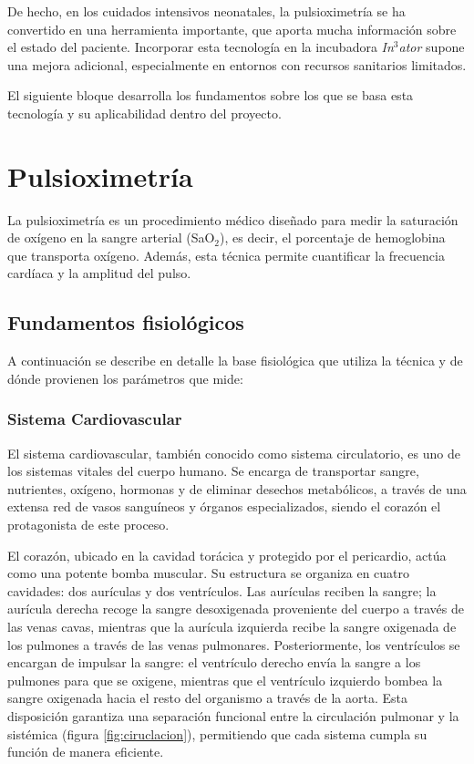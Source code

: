 De hecho, en los cuidados intensivos neonatales, la pulsioximetría se ha convertido en una herramienta importante, que aporta mucha información sobre el estado del paciente. Incorporar esta tecnología en la incubadora \textit{In$^3$ator} supone una mejora adicional, especialmente en entornos con recursos sanitarios limitados.

El siguiente bloque desarrolla los fundamentos sobre los que se basa esta tecnología y su aplicabilidad dentro del proyecto.


\section{Pulsioximetría}

La pulsioximetría es un procedimiento médico diseñado para medir la saturación de oxígeno en la sangre arterial (SaO$_2$), es decir, el porcentaje de hemoglobina que transporta oxígeno. Además, esta técnica permite cuantificar la frecuencia cardíaca y la amplitud del pulso.

\subsection{Fundamentos fisiológicos}

A continuación se describe en detalle la base fisiológica que utiliza la técnica y de dónde provienen los parámetros que mide:

\subsubsection{Sistema Cardiovascular}

El sistema cardiovascular, también conocido como sistema circulatorio, es uno de los sistemas vitales del cuerpo humano. Se encarga de transportar sangre, nutrientes, oxígeno, hormonas y de eliminar desechos metabólicos, a través de una extensa red de vasos sanguíneos y órganos especializados, siendo el corazón el protagonista de este proceso. 

El corazón, ubicado en la cavidad torácica y protegido por el pericardio, actúa como una potente bomba muscular. Su estructura se organiza en cuatro cavidades: dos aurículas y dos ventrículos. Las aurículas reciben la sangre; la aurícula derecha recoge la sangre desoxigenada proveniente del cuerpo a través de las venas cavas, mientras que la aurícula izquierda recibe la sangre oxigenada de los pulmones a través de las venas pulmonares. Posteriormente, los ventrículos se encargan de impulsar la sangre: el ventrículo derecho envía la sangre a los pulmones para que se oxigene, mientras que el ventrículo izquierdo bombea la sangre oxigenada hacia el resto del organismo a través de la aorta. Esta disposición garantiza una separación funcional entre la circulación pulmonar y la sistémica (figura \ref{fig:ciruclacion}), permitiendo que cada sistema cumpla su función de manera eficiente. 

